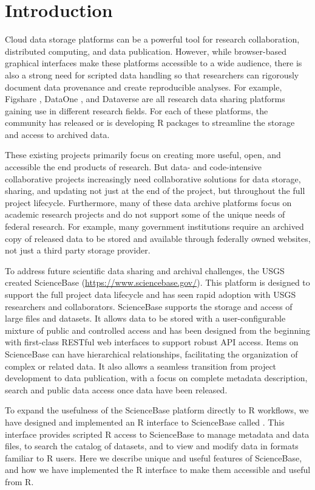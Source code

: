 \section{Introduction}

Cloud data storage platforms can be a powerful tool for research collaboration,
distributed computing, and data publication. However, while browser-based graphical
interfaces make these platforms accessible to a wide audience, there is also
a strong need for scripted data handling so that researchers can rigorously
document data provenance and create reproducible analyses. For example,
Figshare , DataOne , and Dataverse  
are all research data
sharing platforms gaining use in different research fields. For each of these
platforms, the community has released \citep{rfigshare, dvn} or is
developing \citep{dataone} R packages to streamline the storage and access
to archived data.

These existing projects primarily focus on creating more useful, open, and
accessible the end products of research. But data- and code-intensive collaborative projects
increasingly need collaborative solutions for data storage, sharing, and updating
not just at the end of the project, but throughout the full project lifecycle. 
Furthermore, many of these data
archive platforms focus on academic research projects and do not support some
of the unique needs of federal research. For example, many government institutions
require an archived copy of released data to be stored and available through federally
owned websites, not just a third party storage provider.

To address future scientific data sharing and archival challenges, the USGS
created ScienceBase (\url{https://www.sciencebase.gov/}). This platform is
designed to support
the full project data lifecycle and has seen rapid adoption with USGS
researchers and collaborators. ScienceBase supports the storage and access
of large files and datasets. It allows data to be stored with a user-configurable 
mixture of
public and controlled access and has been designed from the beginning with
first-class RESTful web interfaces to support robust API access. Items on ScienceBase 
can have hierarchical relationships, facilitating the organization of complex or related
data. It also allows
a seamless transition from project development to data publication, with
a focus on complete metadata description, search and public data access once 
data have been released.

To expand the usefulness of the ScienceBase platform directly to R workflows, 
we have designed and
implemented an R interface to ScienceBase called .
This interface provides scripted R access to ScienceBase to manage metadata and
data files, to search the catalog of datasets, and to view and modify data in
formats familiar to R users.
Here we describe unique and useful features of ScienceBase, and how we have
implemented the R interface to make them accessible and useful from R.
